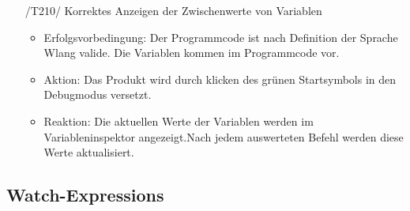 \documentclass[parskip=full]{scrartcl}
\begin{document}
\begin{itemize}
	\item[/T210/] Korrektes Anzeigen der Zwischenwerte von Variablen
		\begin{itemize}
		\item Erfolgsvorbedingung: Der Programmcode ist nach Definition der Sprache Wlang valide. Die Variablen kommen im Programmcode vor.
		\item Aktion: Das Produkt wird durch klicken des grünen Startsymbols in den Debugmodus versetzt.
		\item Reaktion:	Die aktuellen Werte der Variablen werden im Variableninspektor angezeigt.Nach jedem auswerteten Befehl werden diese Werte aktualisiert.	
		\end{itemize}	
	
	
\end{itemize}

\subsection{Watch-Expressions}
\end{document}
